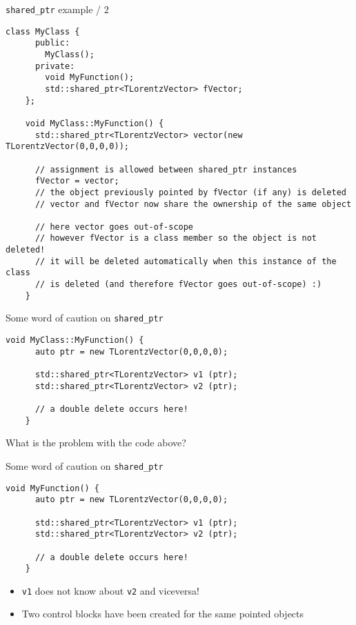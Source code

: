 \documentclass[xcolor={usenames,dvipsnames}]{beamer}
\begin{document}
\begin{frame}[fragile]{\texttt{shared\_ptr} example / 2}
\scriptsize
\begin{lstlisting}[style=base, gobble=4]
    class MyClass {
      public:
        MyClass();
      private:
        void MyFunction();
        std::shared_ptr<TLorentzVector> fVector;
    };

    void MyClass::MyFunction() {
      std::shared_ptr<TLorentzVector> vector(new TLorentzVector(0,0,0,0));
  
      // assignment is allowed between shared_ptr instances
      fVector = vector;
      // the object previously pointed by fVector (if any) is deleted
      // vector and fVector now share the ownership of the same object

      // here vector goes out-of-scope
      // however fVector is a class member so the object is not deleted!
      // it will be deleted automatically when this instance of the class
      // is deleted (and therefore fVector goes out-of-scope) :)
    }
\end{lstlisting}
\end{frame}

\begin{frame}[fragile]{Some word of caution on \texttt{shared\_ptr}}
\scriptsize
\begin{lstlisting}[style=base, gobble=4]
    void MyClass::MyFunction() {
      auto ptr = new TLorentzVector(0,0,0,0);
  
      std::shared_ptr<TLorentzVector> v1 (ptr);
      std::shared_ptr<TLorentzVector> v2 (ptr);
  
      // a double delete occurs here!
    }
\end{lstlisting}
\begin{center}
\small
What is the problem with the code above?
\end{center}
\end{frame}

\begin{frame}[fragile]{Some word of caution on \texttt{shared\_ptr}}
\scriptsize
\begin{lstlisting}[style=base, gobble=4]
    void MyFunction() {
      auto ptr = new TLorentzVector(0,0,0,0);
  
      std::shared_ptr<TLorentzVector> v1 (ptr);
      std::shared_ptr<TLorentzVector> v2 (ptr);
  
      // a double delete occurs here!
    }
\end{lstlisting}
\small
\begin{itemize}
\item \texttt{v1} does not know about \texttt{v2} and viceversa!
\item Two control blocks have been created for the same pointed objects
\end{itemize}
\end{frame}
\end{document}
